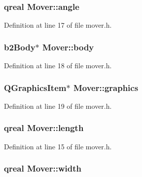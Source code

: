 \subsubsection[{\texorpdfstring{angle}{angle}}]{\setlength{\rightskip}{0pt plus 5cm}qreal Mover\+::angle}\hypertarget{class_mover_acb7d779b2ce97a86149990dce48e88b5}{}\label{class_mover_acb7d779b2ce97a86149990dce48e88b5}


Definition at line 17 of file mover.\+h.

\subsubsection[{\texorpdfstring{body}{body}}]{\setlength{\rightskip}{0pt plus 5cm}b2\+Body$\ast$ Mover\+::body}\hypertarget{class_mover_a6e91384098180f0fef918dd45f97f201}{}\label{class_mover_a6e91384098180f0fef918dd45f97f201}


Definition at line 18 of file mover.\+h.

\subsubsection[{\texorpdfstring{graphics}{graphics}}]{\setlength{\rightskip}{0pt plus 5cm}Q\+Graphics\+Item$\ast$ Mover\+::graphics}\hypertarget{class_mover_a111eebc06a95c11dc6f48dcc6a33478f}{}\label{class_mover_a111eebc06a95c11dc6f48dcc6a33478f}


Definition at line 19 of file mover.\+h.

\subsubsection[{\texorpdfstring{length}{length}}]{\setlength{\rightskip}{0pt plus 5cm}qreal Mover\+::length}\hypertarget{class_mover_a2c55f3d5a807d328bcc8c73cdef5dda2}{}\label{class_mover_a2c55f3d5a807d328bcc8c73cdef5dda2}


Definition at line 15 of file mover.\+h.

\subsubsection[{\texorpdfstring{width}{width}}]{\setlength{\rightskip}{0pt plus 5cm}qreal Mover\+::width}\hypertarget{class_mover_ab78fbf587764d7cdcd417d2a444408d4}{}\label{class_mover_ab78fbf587764d7cdcd417d2a444408d4}


